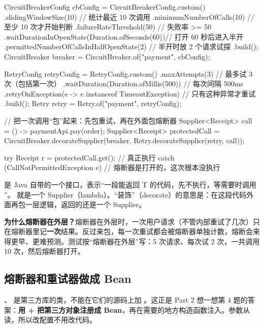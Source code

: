 \begin{java}
CircuitBreakerConfig cbConfig = CircuitBreakerConfig.custom()
        .slidingWindowSize(10)                          // 统计最近 10 次调用
        .minimumNumberOfCalls(10)                       // 至少 10 次才开始判断
        .failureRateThreshold(50)                       // 失败率 >= 50%
        .waitDurationInOpenState(Duration.ofSeconds(60))// 打开 60 秒后进入半开
        .permittedNumberOfCallsInHalfOpenState(2)       // 半开时放 2 个请求试探
        .build();
CircuitBreaker breaker = CircuitBreaker.of("payment", cbConfig);

RetryConfig retryConfig = RetryConfig.custom()
        .maxAttempts(3)                                 // 最多试 3 次（包括第一次）
        .waitDuration(Duration.ofMillis(500))           // 每次间隔 500ms
        .retryOnException(e -> e instanceof TimeoutException)   // 只有这种异常才重试
        .build();
Retry retry = Retry.of("payment", retryConfig);

// 把一次调用“包”起来：先包重试，再在外面包熔断器
Supplier<Receipt> call = () -> paymentApi.pay(order);
Supplier<Receipt> protectedCall =
        CircuitBreaker.decorateSupplier(breaker, Retry.decorateSupplier(retry, call));

try {
    Receipt r = protectedCall.get();                    // 真正执行
} catch (CallNotPermittedException e) {
    // 熔断器是打开的，这次根本没执行
}
\end{java}

 是 Java 自带的一个接口，表示“一段能返回 T 的代码，先不执行，等需要时调用 ”。 就是一个 Supplier（lambda）。“装饰”（decorate）的意思是：在这段代码外面再包一层逻辑，返回的还是一个 Supplier。

\textbf{为什么熔断器在外层？}熔断器在外层时，一次用户请求（不管内部重试了几次）只在熔断器里记\textbf{一次}结果。反过来包，每一次重试都会被熔断器单独计数，熔断会来得更早、更难预测。测试按“熔断器在外层”写：5 次请求、每次试 2 次，一共调用 10 次，然后熔断器打开。

\subsection{熔断器和重试器做成 Bean}

、 是第三方库的类，不能在它们的源码上加 。这正是 Part 2 想一想第 4 题的答案：\textbf{用  +  把第三方对象注册成 Bean}，再在需要的地方构造函数注入。参数从  读，所以改配置不用改代码。

